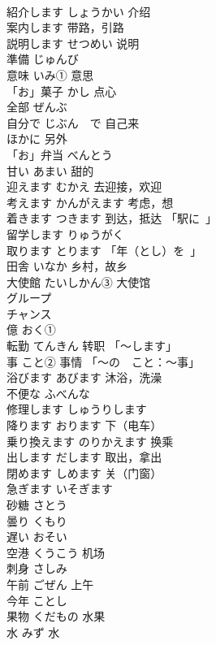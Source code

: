 \documentclass[8pt]{extreport}
\begin{document}
\begin{CJK}{UTF8}{min}
\\	紹介します	しょうかい 介绍	
\\	案内します	带路，引路	
\\	説明します	せつめい 说明	
\\	準備	じゅんび	
\\	意味	いみ① 意思	
\\	「お」菓子	かし 点心	
\\	全部	ぜんぶ	
\\	自分で	じぶん　で 自己来	
\\	ほかに	另外	
\\	「お」弁当	べんとう	
\\	甘い	あまい 甜的	
\\	迎えます	むかえ 去迎接，欢迎	
\\	考えます	かんがえます 考虑，想	
\\	着きます	つきます 到达，抵达 「駅に~」	
\\	留学します	りゅうがく	
\\	取ります	とります 「年（とし）を~」	
\\	田舎	いなか 乡村，故乡	
\\	大使館	たいしかん③ 大使馆	
\\	グループ	
\\	チャンス	
\\	億	おく①	
\\	転勤	てんきん 转职 「～します」	
\\	事	こと② 事情 「～の　こと：～事」	
\\	浴びます	あびます 沐浴，洗澡	
\\	不便な	ふべんな	
\\	修理します	しゅうりします	
\\	降ります	おります 下（电车）	
\\	乗り換えます	のりかえます 换乘	
\\	出します	だします 取出，拿出	
\\	閉めます	しめます 关（门窗）	
\\	急ぎます	いそぎます	
\\	砂糖	さとう	
\\	曇り	くもり	
\\	遅い	おそい	
\\	空港	くうこう 机场	
\\	刺身	さしみ	
\\	午前	ごぜん 上午	
\\	今年	ことし	
\\	果物	くだもの 水果	
\\	水	みず 水	

\end{CJK}
\end{document}
